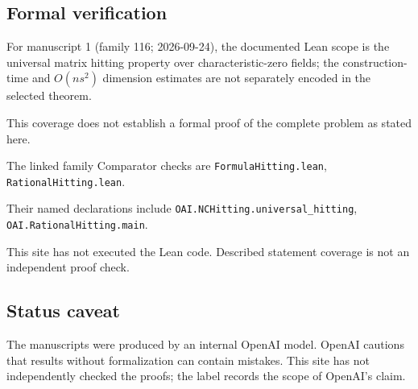 \documentclass[11pt]{article}
\begin{document}
\subsection{Formal verification}
For manuscript 1 (family 116; 2026-09-24), the documented Lean scope is the universal matrix hitting property over characteristic-zero fields; the construction-time and $O(ns^2)$ dimension estimates are not separately encoded in the selected theorem.

This coverage does not establish a formal proof of the complete problem as stated here.

The linked family Comparator checks are \texttt{FormulaHitting.lean}, \texttt{RationalHitting.lean}.

Their named declarations include \texttt{OAI.NCHitting.universal\_hitting}, \texttt{OAI.RationalHitting.main}.

This site has not executed the Lean code. Described statement coverage is not an independent proof check.

\subsection{Status caveat}
The manuscripts were produced by an internal OpenAI model. OpenAI cautions that results without formalization can contain mistakes. This site has not independently checked the proofs; the label records the scope of OpenAI's claim.
\end{document}
